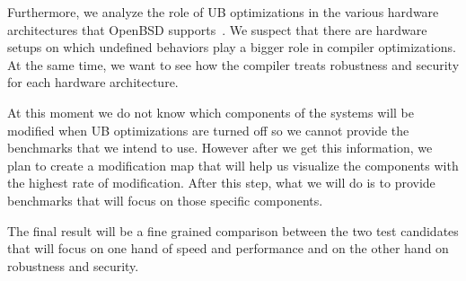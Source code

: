 Furthermore, we analyze the role of UB optimizations in the various
hardware architectures that OpenBSD supports~\cite{obsdhw}. We suspect
that there are hardware setups on which undefined behaviors play a
bigger role in compiler optimizations. At the same time, we want to see
how the compiler treats robustness and security for each hardware
architecture.

At this moment we do not know which components of the systems will be
modified when UB optimizations are turned off so we cannot provide the
benchmarks that we intend to use. However after we get this information,
we plan to create a modification map that will help us visualize the
components with the highest rate of modification. After this step, what
we will do is to provide benchmarks that will focus on those specific
components.

The final result will be a fine grained comparison between the two test
candidates that will focus on one hand of speed and performance and on
the other hand on robustness and security.
